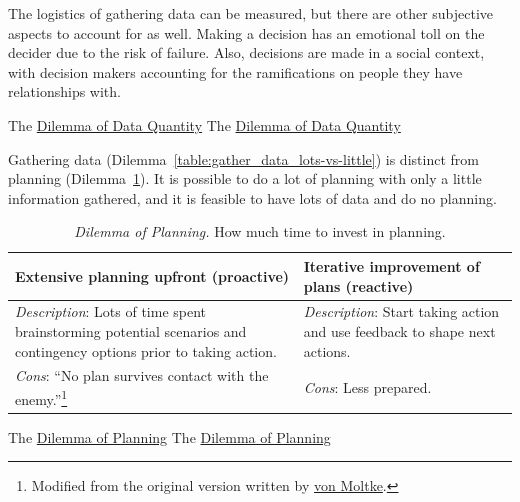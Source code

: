 The logistics of gathering data can be measured, but there are other subjective aspects to account for as well. Making a decision has an emotional toll on the decider due to the risk of failure. Also, decisions are made in a social context, with decision makers accounting for the ramifications on people they have relationships with. 

The \href{table:gather_data_lots-vs-little}{Dilemma of Data Quantity}
The \href{table:gather_data_lots-vs-little}{Dilemma of Data Quantity}


Gathering data (Dilemma~\ref{table:gather_data_lots-vs-little}) is distinct from planning (Dilemma~\ref{table:planning}). It is possible to do a lot of planning with only a little information gathered, and it is feasible to have lots of data and do no planning. 

\begin{center}
\begin{table}[H] %
\begin{tabular}{ | m{\dilemmatablewidth}| m{\dilemmatablewidth} | } 
  \hline
  \textbf{Extensive planning upfront (proactive)} & 
  \textbf{Iterative improvement of plans (reactive)} \\ 
  \hline
  \textit{Description}: Lots of time spent brainstorming potential scenarios and contingency options prior to taking action. & 
  \textit{Description}: Start taking action and use feedback to shape next actions. \\ 
  \hline
  \textit{Cons}: ``No plan survives contact with the enemy.''\footnote{Modified from the original version written by \href{https://en.wikipedia.org/wiki/Helmuth_von_Moltke_the_Elder}{von Moltke}.} & 
  \textit{Cons}: Less prepared. \\  
  \hline
\end{tabular}
\caption{
\textit{Dilemma of Planning.}
How much time to invest in planning.
}
\label{table:planning}
\end{table}
\end{center}

The \href{table:planning}{Dilemma of Planning}
The \href{table:planning}{Dilemma of Planning}


